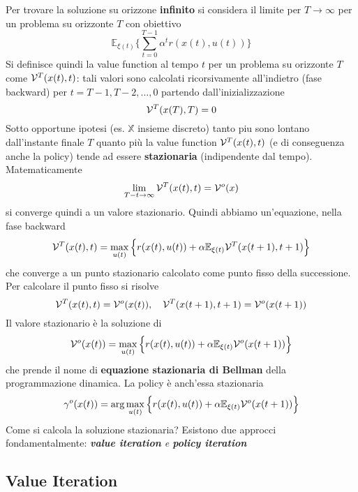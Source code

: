 Per trovare la soluzione su orizzone \textbf{infinito} si considera il limite per $T\to \infty$ per un problema su orizzonte $T$ con obiettivo
\begin{equation}
\mathbb{E}_{\xi(t)} \Big \{ \sum_{t=0}^{T-1} \alpha^t r(x(t),u(t)) \Big \}
\end{equation} Si definisce quindi la value function al tempo $t$ per un problema su orizzonte $T$ come $\mathcal{V}^T(x(t),t)$: tali valori sono calcolati ricorsivamente all'indietro (fase backward) per $t=T-1, T-2, \dots, 0$ partendo dall'inizializzazione
\begin{equation}
\mathcal{V}^T(x(T),T) = 0
\end{equation} Sotto opportune ipotesi (es. $\mathbb{X}$ insieme discreto) tanto piu sono lontano dall'instante finale $T$ quanto pi\`u la value function $\mathcal{V}^T(x(t),t)$ (e di conseguenza anche la policy) tende ad essere \textbf{stazionaria} (indipendente dal tempo). Matematicamente
\begin{equation}
\lim_{T-t \to \infty} \mathcal{V}^T(x(t),t) = \mathcal{V}^o(x)
\end{equation} si converge quindi a un valore stazionario. Quindi abbiamo un'equazione, nella fase backward
\begin{equation}
\mathcal{V}^T(x(t),t) = \max_{u(t)} \Big \{ r(x(t),u(t)) + \alpha \mathbb{E}_{\xi(t)} \mathcal{V}^T (x(t+1), t+1) \Big \}
\end{equation} che converge a un punto stazionario calcolato come punto fisso della successione. Per calcolare il punto fisso si risolve
\begin{equation}
\mathcal{V}^T(x(t),t) = \mathcal{V}^o(x(t)), \quad \mathcal{V}^T(x(t+1),t+1) = \mathcal{V}^o(x(t+1))
\end{equation} Il valore stazionario \`e la soluzione di
\begin{equation}
\mathcal{V}^o(x(t)) = \max_{u(t)} \Big \{ r(x(t),u(t)) + \alpha \mathbb{E}_{\xi(t)} \mathcal{V}^o(x(t+1)) \Big \}
\end{equation} che prende il nome di \textbf{equazione stazionaria di Bellman} della programmazione dinamica. La policy \`e anch'essa stazionaria
\begin{equation}
\gamma^o(x(t)) = \arg \max_{u(t)} \Big \{ r(x(t),u(t)) + \alpha \mathbb{E}_{\xi(t)} \mathcal{V}^o(x(t+1)) \Big \}
\end{equation}
Come si calcola la soluzione stazionaria? Esistono due approcci fondamentalmente: \textit{\textbf{value iteration} e \textbf{policy iteration}}

\subsection{Value Iteration}

